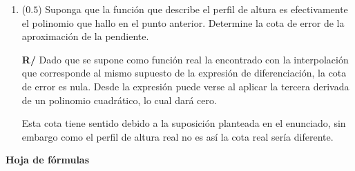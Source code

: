\documentclass[12pt]{article}
\begin{document}
\begin{enumerate}[leftmargin=*,widest=9]
\begin{enumerate}[label=\alph*]
   \item (\(0.5\)) Suponga que la función que describe el perfil de altura es efectivamente el polinomio que hallo en el punto anterior. Determine la cota de error de la aproximación de la pendiente.

   \textbf{R/} Dado que se supone como función real la encontrado con la interpolación que corresponde al mismo supuesto de la expresión de diferenciación, la cota de error es nula. Desde la expresión puede verse al aplicar la tercera derivada de un polinomio cuadrático, lo cual dará cero.

   Esta cota tiene sentido debido a la suposición planteada en el enunciado, sin embargo como el perfil de altura real no es así la cota real sería diferente.
   \end{enumerate}

\end{enumerate}
\begin{center}
\textbf{Hoja de fórmulas}
\end{center}
\end{document}

